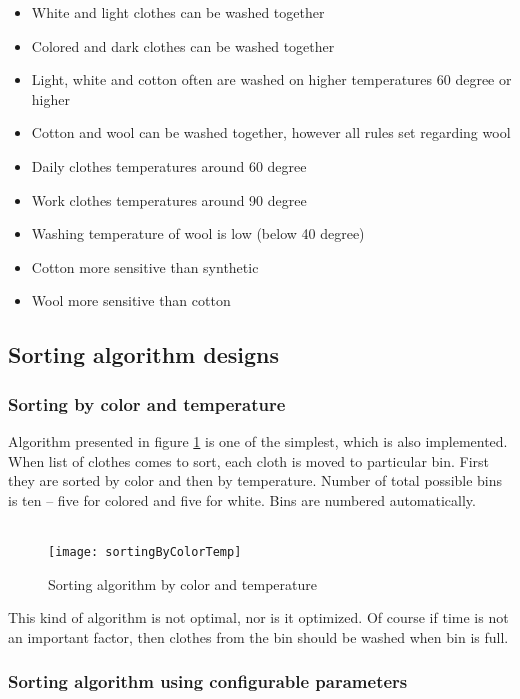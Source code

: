 \begin{itemize}
	\item White and light clothes can be washed together
	\item Colored and dark clothes can be washed together
	\item Light, white and cotton often are washed on higher temperatures 60 degree or higher
	\item Cotton and wool can be washed together, however all rules set regarding wool
	\item Daily clothes temperatures around 60 degree
	\item Work clothes temperatures around 90 degree
	\item Washing temperature of wool is low (below 40 degree)
	\item Cotton more sensitive than synthetic
	\item Wool more sensitive than cotton
\end{itemize}

\subsection{Sorting algorithm designs}

\subsubsection{Sorting by color and temperature}

Algorithm presented in figure \ref{fig:sortingByColorTemp} is one of the simplest, which is also implemented. When list of clothes comes to sort, each cloth is moved to particular bin. First they are sorted by color and then by temperature. Number of total possible bins is ten – five for colored and five for white. Bins are numbered automatically. \\ \\

\begin{figure}[h]
	\centering
		\texttt{[image: sortingByColorTemp]}
	\caption{Sorting algorithm by color and temperature}
	\label{fig:sortingByColorTemp}
\end{figure}

This kind of algorithm is not optimal, nor is it optimized. Of course if time is not an important factor, then clothes from the bin should be washed when bin is full.

\subsubsection{Sorting algorithm using configurable parameters}

